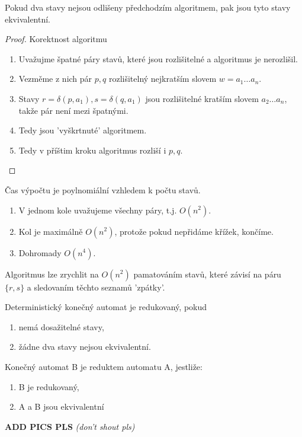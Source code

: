 \documentclass[../main.tex]{subfiles}
\begin{document}
\begin{theorem}
    Pokud dva stavy nejsou odlišeny předchodzím algoritmem, pak jsou tyto stavy ekvivalentní.
\end{theorem}
\begin{proof}
    Korektnost algoritmu
    \begin{enumerate}
        \item Uvažujme špatné páry stavů, které jsou rozlišitelné a algoritmus je nerozlišil.
        \item Vezměme z nich pár $p,q$ rozlišitelný nejkratším slovem $w = a_1\dots a_n.$
        \item Stavy $r = \delta(p,a_1), s= \delta(q,a_1)$ jsou rozlišitelné kratším slovem 
        $a_2\dots a_n$, takže pár není mezi špatnými.
        \item Tedy jsou 'vyškrtnuté' algoritmem.
        \item Tedy v příštim kroku algoritmus rozliší i $p,q$.
    \end{enumerate}
\end{proof}

\noindent
Čas výpočtu je poylnomiální vzhledem k počtu stavů.

\begin{enumerate}
    \item V jednom kole uvažujeme všechny páry, t.j. $O(n^2)$.
    \item Kol je maximálně $O(n^2)$, protože pokud nepřidáme křížek, končíme.
    \item Dohromady $O(n^4)$.
\end{enumerate}
Algoritmus lze zrychlit na $O(n^2)$ pamatováním stavů, které závisí na páru $\{r,s\}$ a sledovaním těchto seznamů 'zpátky'.

\begin{definition}
    Deterministický konečný automat je redukovaný, pokud
    \begin{enumerate}
        \item nemá dosažitelné stavy,
        \item žádne dva stavy nejsou ekvivalentní.
    \end{enumerate}
\end{definition}

\begin{definition}[Redukt]
    Konečný automat B je reduktem automatu A, jestliže:
    \begin{enumerate}
        \item B je redukovaný,
        \item A a B jsou ekvivalentní
    \end{enumerate}
    \textbf{ADD PICS PLS} \textit{(don't shout pls)}
\end{definition}
\end{document}
